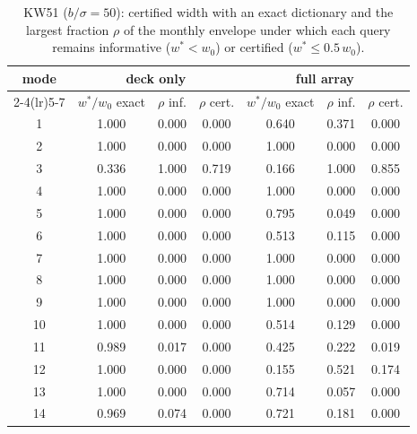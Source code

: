 \begin{table}[h]\centering\footnotesize
\caption{KW51 ($b/\sigma=50$): certified width with an exact dictionary and the largest fraction $\rho$ of the monthly envelope under which each query remains informative ($w^{*}<w_0$) or certified ($w^{*}\le0.5\,w_0$).}\label{tab:s6}
\begin{tabular}{ccccccc}\toprule
mode & \multicolumn{3}{c}{deck only} & \multicolumn{3}{c}{full array}\\
\cmidrule(lr){2-4}\cmidrule(lr){5-7} & $w^{*}/w_0$ exact & $\rho$ inf. & $\rho$ cert. & $w^{*}/w_0$ exact & $\rho$ inf. & $\rho$ cert.\\ \midrule
1 & 1.000 & 0.000 & 0.000 & 0.640 & 0.371 & 0.000 \\
2 & 1.000 & 0.000 & 0.000 & 1.000 & 0.000 & 0.000 \\
3 & 0.336 & 1.000 & 0.719 & 0.166 & 1.000 & 0.855 \\
4 & 1.000 & 0.000 & 0.000 & 1.000 & 0.000 & 0.000 \\
5 & 1.000 & 0.000 & 0.000 & 0.795 & 0.049 & 0.000 \\
6 & 1.000 & 0.000 & 0.000 & 0.513 & 0.115 & 0.000 \\
7 & 1.000 & 0.000 & 0.000 & 1.000 & 0.000 & 0.000 \\
8 & 1.000 & 0.000 & 0.000 & 1.000 & 0.000 & 0.000 \\
9 & 1.000 & 0.000 & 0.000 & 1.000 & 0.000 & 0.000 \\
10 & 1.000 & 0.000 & 0.000 & 0.514 & 0.129 & 0.000 \\
11 & 0.989 & 0.017 & 0.000 & 0.425 & 0.222 & 0.019 \\
12 & 1.000 & 0.000 & 0.000 & 0.155 & 0.521 & 0.174 \\
13 & 1.000 & 0.000 & 0.000 & 0.714 & 0.057 & 0.000 \\
14 & 0.969 & 0.074 & 0.000 & 0.721 & 0.181 & 0.000 \\
\bottomrule\end{tabular}\end{table}